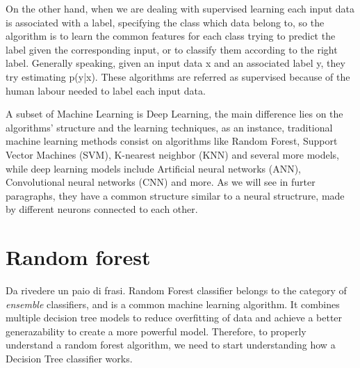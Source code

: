 \documentclass[12pt]{report}
\begin{document}

On the other hand, when we are dealing with supervised learning each input data is associated with a label, specifying the class which data belong to, so the algorithm is to learn the common features for each class trying to predict the label given the corresponding input, or to classify them according to the right label.
Generally speaking, given an input data x and an associated label y, they try estimating p(y|x). These algorithms are referred as supervised because of the human labour needed to label each input data.

A subset of Machine Learning is Deep Learning, the main difference lies on the algorithms' structure and the learning techniques, as an instance, traditional machine learning methods consist on algorithms like Random Forest, Support Vector Machines (SVM), K-nearest neighbor (KNN) and several more models, while deep learning models include Artificial neural networks (ANN), Convolutional neural networks (CNN) and more.
As we will see in furter paragraphs, they have a common structure similar to a neural structrure, made by different neurons connected to each other.




\section{Random forest}
Da rivedere un paio di frasi.
Random Forest classifier belongs to the category of \emph{ensemble} classifiers, and is a common machine learning algorithm.
It combines multiple decision tree models to reduce overfitting of data and achieve a better generazability to create a more powerful model.
Therefore, to properly understand a random forest algorithm, we need to start understanding how a Decision Tree classifier works.
\end{document}
